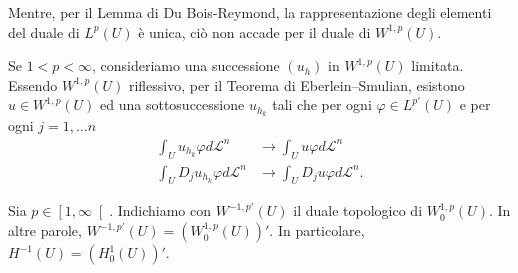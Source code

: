 \begin{osservazione}
	Mentre, per il Lemma di Du Bois-Reymond, la rappresentazione degli elementi del duale di $L^p(U)$ è unica, ciò non accade per il duale di $W^{1,p}(U)$.
\end{osservazione}

\begin{osservazione}\label{convergenzadeboleW1,p}
	Se $1 < p < \infty$, consideriamo una successione $(u_h)$ in $W^{1,p}(U)$ limitata. Essendo $W^{1,p}(U)$ riflessivo, per il Teorema di Eberlein--Smulian, esistono $u \in W^{1,p}(U)$ ed una sottosuccessione $u_{h_{k}}$ tali che per ogni $\varphi \in L^{p'}(U)$ e per ogni $j=1,\dots n$ 
	\begin{align*}
		\int_{U}u_{h_{k}}\varphi d\mathcal{L}^n &\to \int_{U}u\varphi d\mathcal{L}^n \\
		\int_{U}D_j u_{h_{k}}\varphi d\mathcal{L}^n &\to \int_{U}D_ju\varphi d\mathcal{L}^n.
	\end{align*}
\end{osservazione}

\begin{notazione}
	Sia $p \in \left[ 1,\infty\right[  $. Indichiamo con $W^{-1,p'}(U)$ il duale topologico di $W^{1,p}_0(U)$. In altre parole, $W^{-1,p'}(U) = (W^{1,p}_0(U))'$. In particolare, $H^{-1}(U) = (H^1_0(U))'$.
\end{notazione}

